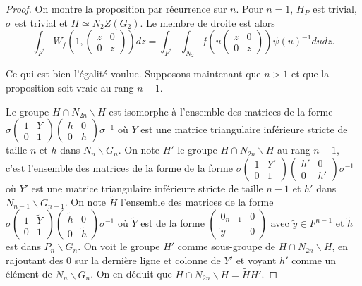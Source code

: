 \documentclass{amsart}
\begin{document}
\begin{proof}
On montre la proposition par récurrence sur $n$. Pour $n=1$, $H_P$ est trivial, $\sigma$ est trivial et $H \simeq N_2 Z(G_2)$. Le membre de droite est alors
\begin{equation}
\int_{F^*} W_f \left(1, \begin{pmatrix}
z & 0 \\
0 & z
\end{pmatrix} \right) dz = \int_{F^*} \int_{N_2} f \left(u\begin{pmatrix}
z & 0 \\
0 & z
\end{pmatrix} \right) \psi(u)^{-1} du dz.
\end{equation}

Ce qui est bien l'égalité voulue. Supposons maintenant que $n > 1$ et que la proposition soit vraie au rang $n-1$.

Le groupe $H \cap N_{2n} \backslash{H}$ est isomorphe à l'ensemble des matrices
de la forme $\sigma \begin{pmatrix}
1 & Y \\
0 & 1
\end{pmatrix}\begin{pmatrix}
h & 0 \\
0 & h
\end{pmatrix} \sigma^{-1}$ où $Y$ est une matrice triangulaire inférieure stricte de taille $n$ et $h$ dans $N_n\backslash{G_n}$. On note $H'$ le groupe $H \cap N_{2n} \backslash{H}$ au rang $n-1$, c'est l'ensemble des matrices de la forme
de la forme $\sigma \begin{pmatrix}
1 & Y' \\
0 & 1
\end{pmatrix}\begin{pmatrix}
h' & 0 \\
0 & h'
\end{pmatrix} \sigma^{-1}$ où $Y'$ est une matrice triangulaire inférieure stricte de taille $n-1$ et $h'$ dans $N_{n-1}\backslash{G_{n-1}}$.
On note $\tilde{H}$ l'ensemble des matrices de la
forme $\sigma \begin{pmatrix}
1 & \tilde{Y} \\
0 & 1
\end{pmatrix}\begin{pmatrix}
\tilde{h} & 0 \\
0 & \tilde{h}
\end{pmatrix} \sigma^{-1}$
où $\tilde{Y}$ est de la forme $\begin{pmatrix}
0_{n-1} & 0 \\
\tilde{y} & 0
\end{pmatrix}$ avec $\tilde{y} \in F^{n-1}$ et $\tilde{h}$ est dans $P_n \backslash{G_n}$. On voit le groupe $H'$ comme sous-groupe de $H \cap N_{2n} \backslash{H}$, en rajoutant des 0 sur la dernière ligne et colonne de $Y'$ et voyant $h'$ comme un élément de $N_n\backslash{G_n}$. On en déduit que $H \cap N_{2n} \backslash{H} = \tilde{H} H'$. 


\end{proof}
\end{document}
